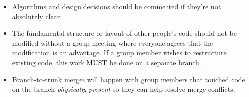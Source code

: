 \documentclass[11pt]{article}
\begin{document}
\begin{itemize}
\begin{itemize}
\item Algorithms and design decisions should be commented if they're not
  absolutely clear
\item The fundamental structure or layout of other people's code should not be
  modified without a group meeting where everyone agrees that the modification
  is an advantage. If a group member wishes to restructure existing code, this
  work MUST be done on a separate branch.
\item Branch-to-trunk merges will happen with group members that touched code on
  the branch \textit{physically present} so they can help resolve merge conflicts.
\end{itemize}
\end{itemize}
\end{document}
